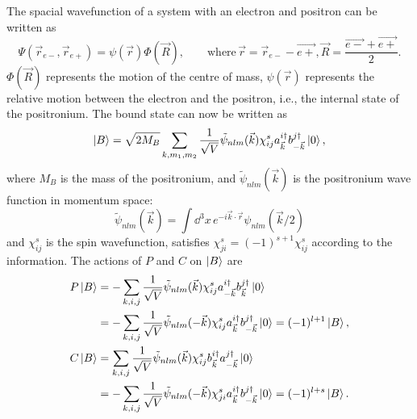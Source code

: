 \solution
\begin{problembody}
    \item The spacial wavefunction of a system with an electron and positron can be written as
    \begin{equation*}
        \Psi(\vec{r}_{e-}, \vec{r}_{e+}) = \psi(\vec{r})\Phi(\vec{R}), 
        \qquad \text{where} \, \vec{r} = \vec{r}_{e-} - \vec{e+},
        \vec{R} = \frac{\vec{e-} + \vec{e+}}{2}.
    \end{equation*}
    $\Phi(\vec{R})$ represents the motion of the centre of mass, $\psi(\vec{r})$ represents the relative motion between
    the electron and the positron, i.e., the internal state of the positronium. The bound state can now be written as
    \begin{equation*}
        \left|B\right\rangle = \sqrt{2M_B}\sum_{k, m_1, m_2}\frac{1}{\sqrt{V}}
        \tilde{\psi}_{nlm}(\vec{k})\chi_{ij}^s 
        a_{\vec{k}}^{i\dagger} b_{-\vec{k}}^{j\dagger}
        \left|0\right\rangle,
    \end{equation*}
    where $M_B$ is the mass of the positronium, and $\tilde{\psi}_{nlm}(\vec{k})$ is the positronium wave function in momentum space:
    \begin{equation*}
        \tilde{\psi}_{nlm}(\vec{k}) = \int \dd^3x \, 
        e^{-i\vec{k}\cdot\vec{r}}
        \psi_{nlm}(\vec{k} / 2)
    \end{equation*}
    and $\chi_{ij}^s$ is the spin wavefunction, satisfies $\chi_{ji}^s = (-1)^{s + 1}\chi_{ij}^s$ according to the information.
    The actions of $P$ and $C$ on $\left|B\right\rangle$ are
    \begin{align*}
        P\left|B\right\rangle & = -\sum_{k, i, j}\frac{1}{\sqrt{V}}
        \tilde{\psi}_{nlm}(\vec{k})\chi_{ij}^s 
        a_{-\vec{k}}^{i\dagger} b_{\vec{k}}^{j\dagger}
        \left|0\right\rangle\\
        & = -\sum_{k, i, j}\frac{1}{\sqrt{V}}
        \tilde{\psi}_{nlm}(-\vec{k})\chi_{ij}^s 
        a_{\vec{k}}^{i\dagger} b_{-\vec{k}}^{j\dagger}
        \left|0\right\rangle = (-1)^{l + 1}\left|B\right\rangle,\\
        C\left|B\right\rangle & = \sum_{k, i, j}\frac{1}{\sqrt{V}}
        \tilde{\psi}_{nlm}(\vec{k})\chi_{ij}^s 
        b_{\vec{k}}^{i\dagger} a_{-\vec{k}}^{j\dagger}
        \left|0\right\rangle\\
        & = -\sum_{k, i, j}\frac{1}{\sqrt{V}}
        \tilde{\psi}_{nlm}(-\vec{k})\chi_{ji}^s 
        a_{\vec{k}}^{i\dagger} b_{-\vec{k}}^{j\dagger}
        \left|0\right\rangle = (-1)^{l + s}\left|B\right\rangle.
    \end{align*}


\end{problembody}

